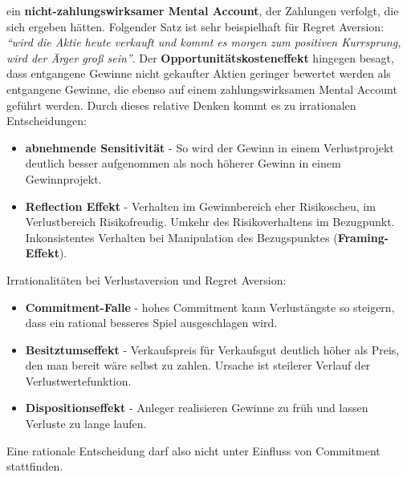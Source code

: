 ein \textbf{nicht-zahlungswirksamer Mental Account}, der Zahlungen verfolgt,
die sich ergeben hätten. Folgender Satz ist sehr beispielhaft für Regret Aversion:
\textit{``wird die Aktie heute verkauft und kommt es morgen zum positiven
Kurrsprung, wird der Ärger groß sein''}. Der \textbf{Opportunitätskosteneffekt}
hingegen besagt, dass entgangene Gewinne nicht gekaufter Aktien geringer
bewertet werden als entgangene Gewinne, die ebenso auf einem
zahlungswirksamen Mental Account geführt werden. Durch dieses relative Denken
kommt es zu irrationalen Entscheidungen:
\begin{itemize}
    \item \textbf{abnehmende Sensitivität} - So wird der Gewinn in einem Verlustprojekt
        deutlich besser aufgenommen als noch höherer Gewinn in einem
        Gewinnprojekt.
    \item \textbf{Reflection Effekt} - Verhalten im Gewinnbereich
        eher Risikoscheu, im Verlustbereich Risikofreudig. Umkehr des
        Risikoverhaltens im Bezugpunkt. Inkonsistentes Verhalten bei
        Manipulation des Bezugspunktes (\textbf{Framing-Effekt}).
\end{itemize}
Irrationalitäten bei Verlustaversion und Regret Aversion:
\begin{itemize}
    \item \textbf{Commitment-Falle} - hohes Commitment kann Verlustängste
        so steigern, dass ein rational besseres Spiel ausgeschlagen wird.
    \item \textbf{Besitztumseffekt} - Verkaufspreis für Verkaufsgut deutlich
        höher als Preis, den man bereit wäre selbst zu zahlen. Ursache ist
        steilerer Verlauf der Verlustwertefunktion.
    \item \textbf{Dispositionseffekt} - Anleger realisieren Gewinne zu früh
        und lassen Verluste zu lange laufen.
\end{itemize}
Eine rationale Entscheidung darf also nicht unter Einfluss von Commitment
stattfinden.

